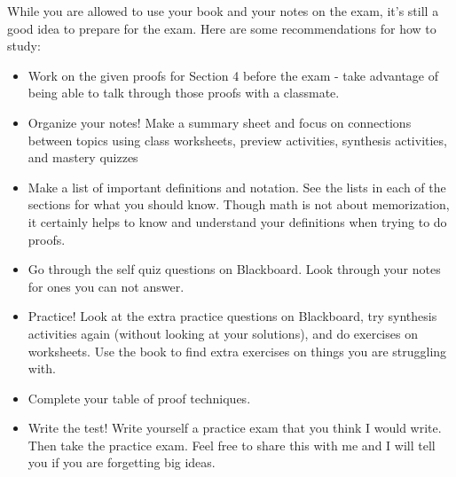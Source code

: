 \documentclass[12pt]{amsart}
\theoremstyle{definition}
\begin{document}
While you are allowed to use your book and your notes on the exam, it's still a good idea to prepare for the exam. Here are some recommendations for how to study:
\begin{itemize}
\item Work on the given proofs for Section 4 before the exam - take advantage of being able to talk through those proofs with a classmate.
\item Organize your notes! Make a summary sheet and focus on connections between topics using class worksheets, preview activities, synthesis activities, and mastery quizzes 
\item Make a list of important definitions and notation. See the lists in each of the sections for what you should know. Though math is not about memorization, it certainly helps to know and understand your definitions when trying to do proofs.
\item Go through the self quiz questions on Blackboard. Look through your notes for ones you can not answer.
\item Practice!  Look at the extra practice questions on Blackboard, try synthesis activities again (without looking at your solutions), and do exercises on worksheets.  Use the book to find extra exercises on things you are struggling with.
\item Complete your table of proof techniques.
\item Write the test! Write yourself a practice exam that you think I would write.  Then take the practice exam.  Feel free to share this with me and I will tell you if you are forgetting big ideas.
\end{itemize}

\vfill
\end{document}
